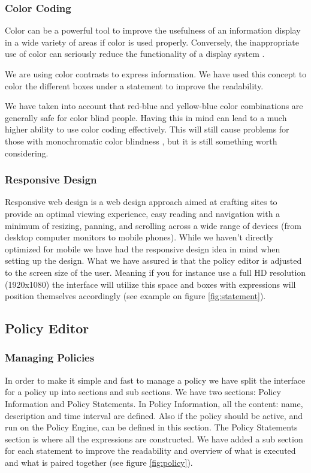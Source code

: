 \subsubsection{Color Coding}
Color can be a powerful tool to improve the usefulness of an information display in a wide variety of areas if color is used properly. Conversely, the inappropriate use of color can seriously reduce the functionality of a display system \cite{colorcoding}.

We are using color contrasts to express information. We have used this concept to color the different boxes under a statement to improve the readability. 

We have taken into account that red-blue and yellow-blue color combinations are generally safe for color blind people. Having this in mind can lead to a much higher ability to use color coding effectively. This will still cause problems for those with monochromatic color blindness \cite{colorblind}, but it is still something worth considering.

\subsubsection{Responsive Design}
Responsive web design is a web design approach aimed at crafting sites to provide an optimal viewing experience, easy reading and navigation with a minimum of resizing, panning, and scrolling across a wide range of devices (from desktop computer monitors to mobile phones). While we haven't directly optimized for mobile we have had the responsive design idea in mind when setting up the design. What we have assured is that the policy editor is adjusted to the screen size of the user. Meaning if you for instance use a full HD resolution (1920x1080) the interface will utilize this space and boxes with expressions will position themselves accordingly (see example on figure \ref{fig:statement}).

\subsection{Policy Editor}

\subsubsection{Managing Policies}
\label{managing-policies}
In order to make it simple and fast to manage a policy we have split the interface for a policy up into sections and sub sections. We have two sections: Policy Information and Policy Statements. In Policy Information, all the content: name, description and time interval are defined. Also if the policy should be active, and run on the Policy Engine, can be defined in this section. The Policy Statements section is where all the expressions are constructed. We have added a sub section for each statement to improve the readability and overview of what is executed and what is paired together (see figure \ref{fig:policy}).  


